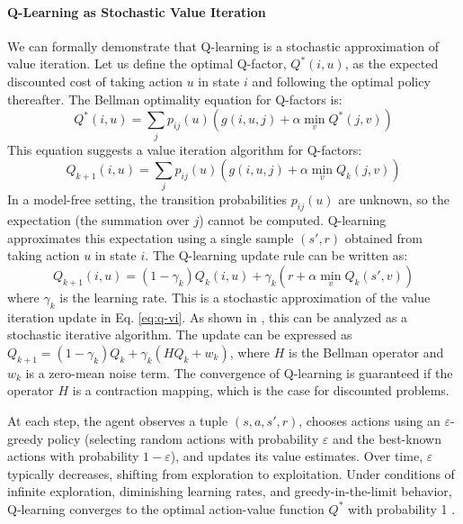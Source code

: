 \paragraph{Q-Learning as Stochastic Value Iteration}
We can formally demonstrate that Q-learning is a stochastic approximation of value iteration. Let us define the optimal Q-factor, $Q^*(i,u)$, as the expected discounted cost of taking action $u$ in state $i$ and following the optimal policy thereafter. The Bellman optimality equation for Q-factors is:
\begin{equation}
Q^*(i,u) = \sum_j p_{ij}(u) \left( g(i,u,j) + \alpha \min_{v} Q^*(j,v) \right)
\label{eq:q-bellman}
\end{equation}
This equation suggests a value iteration algorithm for Q-factors:
\begin{equation}
Q_{k+1}(i,u) = \sum_j p_{ij}(u) \left( g(i,u,j) + \alpha \min_{v} Q_k(j,v) \right)
\label{eq:q-vi}
\end{equation}
In a model-free setting, the transition probabilities $p_{ij}(u)$ are unknown, so the expectation (the summation over $j$) cannot be computed. Q-learning approximates this expectation using a single sample $(s', r)$ obtained from taking action $u$ in state $i$. The Q-learning update rule can be written as:
\begin{equation}
Q_{k+1}(i,u) = (1-\gamma_k)Q_k(i,u) + \gamma_k \left( r + \alpha \min_{v} Q_k(s',v) \right)
\label{eq:q-learning-update}
\end{equation}
where $\gamma_k$ is the learning rate. This is a stochastic approximation of the value iteration update in Eq. \ref{eq:q-vi}. As shown in \citet{bertsekas1996}, this can be analyzed as a stochastic iterative algorithm. The update can be expressed as $Q_{k+1} = (1-\gamma_k)Q_k + \gamma_k(HQ_k + w_k)$, where $H$ is the Bellman operator and $w_k$ is a zero-mean noise term. The convergence of Q-learning is guaranteed if the operator $H$ is a contraction mapping, which is the case for discounted problems.

At each step, the agent observes a tuple $(s,a,s',r)$, chooses actions using an $\varepsilon$-greedy policy (selecting random actions with probability $\varepsilon$ and the best-known actions with probability $1-\varepsilon$), and updates its value estimates. Over time, $\varepsilon$ typically decreases, shifting from exploration to exploitation. Under conditions of infinite exploration, diminishing learning rates, and greedy-in-the-limit behavior, Q-learning converges to the optimal action-value function $Q^*$ with probability 1 \citep{watkins1992_paper}.

